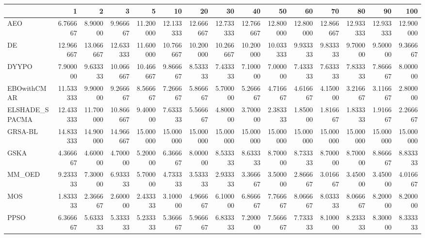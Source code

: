 \begin{tabular}{lrrrrrrrrrrrrrr}
\toprule
{} &        1   &        2   &        3   &        5   &        10  &        20  &        30  &        40  &        50  &        60  &        70  &        80  &        90  &        100 \\
\midrule
AEO            &   6.766667 &   8.900000 &   9.966667 &  11.200000 &  12.133333 &  12.666667 &  12.733333 &  12.766667 &  12.800000 &  12.800000 &  12.866667 &  12.933333 &  12.933333 &  12.900000 \\
DE             &  12.966667 &  13.066667 &  12.633333 &  11.600000 &  10.766667 &  10.200000 &  10.266667 &  10.200000 &  10.033333 &   9.933333 &   9.833333 &   9.700000 &   9.500000 &   9.366667 \\
DYYPO          &   7.900000 &   9.633333 &  10.066667 &  10.466667 &   9.866667 &   8.533333 &   7.433333 &   7.100000 &   7.000000 &   7.433333 &   7.633333 &   7.833333 &   7.866667 &   8.000000 \\
EBOwithCMAR    &  11.533333 &   9.900000 &   9.266667 &   8.566667 &   7.266667 &   5.866667 &   5.700000 &   5.266667 &   4.716667 &   4.616667 &   4.150000 &   3.216667 &   3.116667 &   2.800000 \\
ELSHADE\_SPACMA &  12.433333 &  11.700000 &  10.866667 &   9.400000 &   7.633333 &   5.566667 &   4.800000 &   3.700000 &   2.383333 &   1.850000 &   1.816667 &   1.833333 &   1.916667 &   2.266667 \\
GRSA-BL        &  14.833333 &  14.900000 &  14.966667 &  15.000000 &  15.000000 &  15.000000 &  15.000000 &  15.000000 &  15.000000 &  15.000000 &  15.000000 &  15.000000 &  15.000000 &  15.000000 \\
GSKA           &   4.366667 &   4.600000 &   4.700000 &   5.200000 &   6.366667 &   8.000000 &   8.533333 &   8.633333 &   8.700000 &   8.733333 &   8.700000 &   8.700000 &   8.866667 &   8.833333 \\
MM\_OED         &   9.233333 &   7.300000 &   6.933333 &   5.700000 &   4.733333 &   3.533333 &   2.933333 &   3.366667 &   3.500000 &   2.866667 &   3.016667 &   3.450000 &   3.450000 &   4.016667 \\
MOS            &   1.833333 &   2.366667 &   2.600000 &   2.433333 &   3.100000 &   4.966667 &   6.100000 &   6.866667 &   7.766667 &   8.066667 &   8.033333 &   8.066667 &   8.200000 &   8.200000 \\
PPSO           &   6.366667 &   5.633333 &   5.333333 &   5.233333 &   5.366667 &   5.966667 &   6.833333 &   7.200000 &   7.566667 &   7.733333 &   8.100000 &   8.233333 &   8.300000 &   8.333333 \\

\end{tabular}
